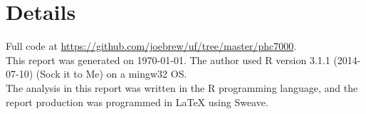 \documentclass[11pt]{article}
\begin{document}
\section*{Details}

Full code at \href{https://github.com/joebrew/uf/tree/master/phc7000}{https://github.com/joebrew/uf/tree/master/phc7000}. \\

This report was generated on \today.  The author used R version 3.1.1 (2014-07-10) (Sock it to Me) on a mingw32 OS.  \\

The analysis in this report was written in the R programming language, and the report production was programmed in \LaTeX{} using Sweave.\\
\end{document}
